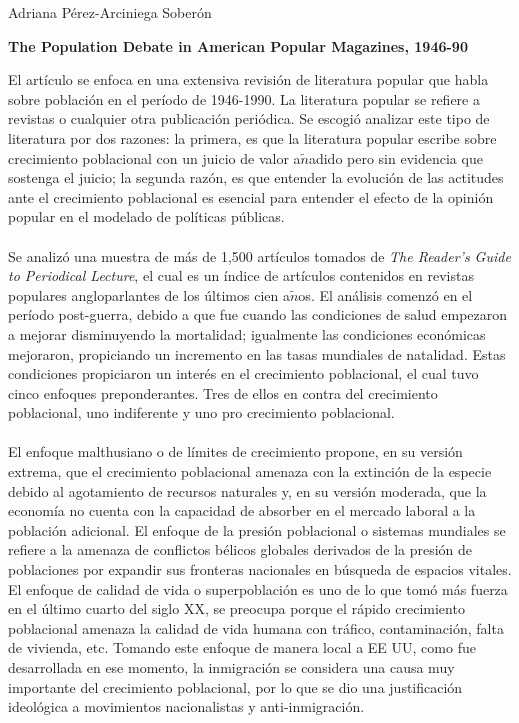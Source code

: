 \documentclass[11pt,spanish,letterpaper]{article}
\theoremstyle{plain}
\begin{document}
\begin{flushleft}
Adriana P\'erez-Arciniega Sober\'on
\end{flushleft}
\begin{center}
\textbf{The Population Debate in American Popular Magazines, 1946-90}
\end{center} 
El art\'iculo \cite{wilmoth1992population} se enfoca en una extensiva revisi\'on de literatura popular que habla sobre poblaci\'on en el per\'iodo de 1946-1990. La literatura popular se refiere a revistas o cualquier otra publicaci\'on peri\'odica. Se escogi\'o analizar este tipo de literatura por dos razones: la primera, es que la literatura popular escribe sobre crecimiento poblacional con un juicio de valor a$\tilde{n}$adido pero sin evidencia que sostenga el juicio; la segunda raz\'on, es que entender la evoluci\'on de las actitudes ante el crecimiento poblacional es esencial para entender el efecto de la opini\'on popular en el modelado de pol\'iticas p\'ublicas.\\
\\
Se analiz\'o una muestra de m\'as de 1,500 art\'iculos tomados de \textit{The Reader's Guide to Periodical Lecture}, el cual es un \'indice de art\'iculos contenidos en revistas populares angloparlantes de los \'ultimos cien a$\tilde{n}$os. El an\'alisis comenz\'o en el per\'iodo post-guerra, debido a que fue cuando las condiciones de salud empezaron a mejorar disminuyendo la mortalidad; igualmente las condiciones econ\'omicas mejoraron, propiciando un incremento en las tasas mundiales de natalidad. Estas condiciones propiciaron un inter\'es en el crecimiento poblacional, el cual tuvo cinco enfoques preponderantes. Tres de ellos en contra del crecimiento poblacional, uno indiferente y uno pro crecimiento poblacional.\\
\\
El enfoque malthusiano o de l\'imites de crecimiento propone, en su versi\'on extrema, que el crecimiento poblacional amenaza con la extinci\'on de la especie debido al agotamiento de recursos naturales y, en su versi\'on moderada, que la econom\'ia no cuenta con la capacidad de absorber en el mercado laboral a la poblaci\'on adicional. El enfoque de la presi\'on poblacional o sistemas mundiales se refiere a la amenaza de conflictos b\'elicos globales derivados de la presi\'on de poblaciones por expandir sus fronteras nacionales en b\'usqueda de espacios vitales. El enfoque de calidad de vida o superpoblaci\'on es uno de lo que tom\'o m\'as fuerza en el \'ultimo cuarto del siglo XX, se preocupa porque el r\'apido crecimiento poblacional amenaza la calidad de vida humana con tr\'afico, contaminaci\'on, falta de vivienda, etc. Tomando este enfoque de manera local a EE UU, como fue desarrollada en ese momento, la inmigraci\'on se considera una causa muy importante del crecimiento poblacional, por lo que se dio una justificaci\'on ideol\'ogica a movimientos nacionalistas y anti-inmigraci\'on.\\
\end{document}
